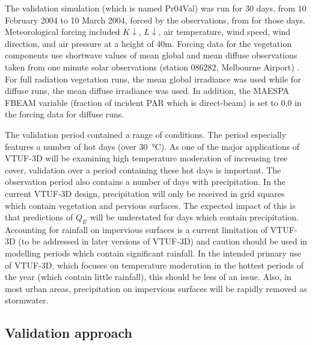 \documentclass[final,3p,times,authoryear]{elsarticle}
\begin{document}
The validation simulation (which is named Pr04Val) was run for 30 days, from 10 February 2004 to 10 March 2004, forced by the observations, from \cite{Coutts2007} for those days. Meteorological forcing included $K\downarrow$, $L\downarrow$, air temperature, wind speed, wind direction, and air pressure at a height of 40m. Forcing data for the vegetation components use shortwave values of mean global and mean diffuse observations taken from one minute solar observations (station 086282, Melbourne Airport) \citep{BOM2016}. For full radiation vegetation runs, the mean global irradiance was used while for diffuse runs, the mean diffuse irradiance was used. In addition, the MAESPA FBEAM variable (fraction of incident PAR which is direct-beam) is set to 0.0 in the forcing data for diffuse runs.

The validation period contained a range of conditions. The period especially features a number of hot days (over \SI{30}{\degreeCelsius}). As one of the major applications of VTUF-3D will be examining high temperature moderation of increasing tree cover, validation over a period containing these hot days is important. The observation period also contains a number of days with precipitation. In the current VTUF-3D design, precipitation will only be received in grid squares which contain vegetation and pervious surfaces. The expected impact of this is that predictions of $Q_{E}$ will be understated for days which contain precipitation. Accounting for rainfall on impervious surfaces is a current limitation of VTUF-3D (to be addressed in later versions of VTUF-3D) and caution should be used in modelling periods which contain significant rainfall. In the intended primary use of VTUF-3D, which focuses on temperature moderation in the hottest periods of the year (which contain little rainfall), this should be less of an issue. Also, in most urban areas, precipitation on impervious surfaces will be rapidly removed as stormwater.

\subsection{Validation approach}\label{sec:prvalresults}
\end{document}
